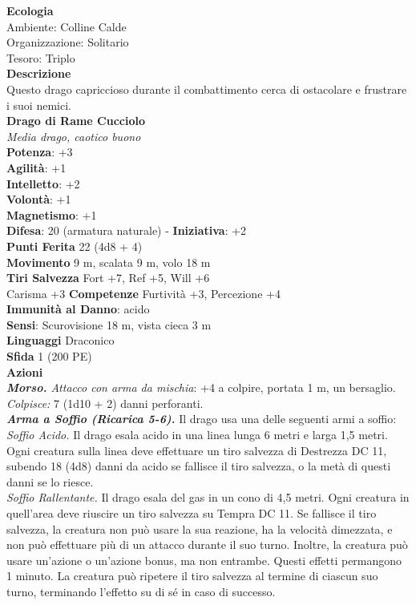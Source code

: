 \begin{multicols}{2}
\textbf{Ecologia}\\
Ambiente: Colline Calde\\
Organizzazione: Solitario\\
Tesoro: Triplo\\
\textbf{Descrizione}\\
Questo drago capriccioso durante il combattimento cerca di ostacolare e frustrare i suoi nemici.\\


\medskip\textbf{Drago di Rame Cucciolo}\\
\emph{Media drago, caotico buono}\\
\textbf{Potenza}: +3\\
\textbf{Agilità}: +1\\
\textbf{Intelletto}: +2\\
\textbf{Volontà}: +1\\
\textbf{Magnetismo}: +1\\
\textbf{Difesa}: 20 (armatura naturale) - \textbf{Iniziativa}: +2\\
\textbf{Punti Ferita} 22 (4d8 + 4)\\
\textbf{Movimento} 9 m, scalata 9 m, volo 18 m\\
\textbf{Tiri Salvezza} Fort +7, Ref +5, Will +6\\
Carisma +3 \textbf{Competenze} Furtività +3, Percezione +4\\
\textbf{Immunità al Danno}: acido\\
\textbf{Sensi}: Scurovisione 18 m, vista cieca 3 m\\
\textbf{Linguaggi} Draconico\\
\textbf{Sfida} 1 (200 PE)\smallskip\\
\smallskip\textbf{Azioni}\\
\emph{\textbf{Morso.} Attacco con arma da mischia}: +4 a colpire, portata 1 m, un bersaglio.\\
\emph{Colpisce:} 7 (1d10 + 2) danni perforanti.\\
\emph{\textbf{Arma a Soffio (Ricarica 5-6).}} Il drago usa una delle seguenti armi a soffio:\\
\emph{Soffio Acido.} Il drago esala acido in una linea lunga 6 metri e larga 1,5 metri. Ogni creatura sulla linea deve effettuare un tiro salvezza di Destrezza DC 11, subendo 18 (4d8) danni da acido se fallisce il tiro salvezza, o la metà di questi danni se lo riesce.\\
\emph{Soffio Rallentante.} Il drago esala del gas in un cono di 4,5 metri. Ogni creatura in quell'area deve riuscire un tiro salvezza su Tempra DC 11. Se fallisce il tiro salvezza, la creatura non può usare la sua reazione, ha la velocità dimezzata, e non può effettuare più di un attacco durante il suo turno. Inoltre, la creatura può usare un'azione o un'azione bonus, ma non entrambe. Questi effetti permangono 1 minuto. La creatura può ripetere il tiro salvezza al termine di ciascun suo turno, terminando l'effetto su di sé in caso di successo.\\

\end{multicols}
